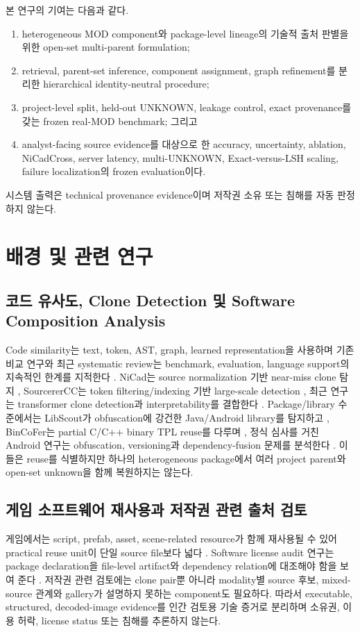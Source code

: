 \documentclass[runningheads]{llncs}
\begin{document}
본 연구의 기여는 다음과 같다.
\begin{enumerate}
    \item heterogeneous MOD component와 package-level lineage의 기술적 출처 판별을 위한 open-set multi-parent formulation;
    \item retrieval, parent-set inference, component assignment, graph refinement를 분리한 hierarchical identity-neutral procedure;
    \item project-level split, held-out UNKNOWN, leakage control, exact provenance를 갖는 frozen real-MOD benchmark; 그리고
    \item analyst-facing source evidence를 대상으로 한 accuracy, uncertainty, ablation, NiCadCross, server latency, multi-UNKNOWN, Exact-versus-LSH scaling, failure localization의 frozen evaluation이다.
\end{enumerate}
시스템 출력은 technical provenance evidence이며 저작권 소유 또는 침해를 자동 판정하지 않는다.

\section{배경 및 관련 연구}

\subsection{코드 유사도, Clone Detection 및 Software Composition Analysis}
Code similarity는 text, token, AST, graph, learned representation을 사용하며 기존 비교 연구와 최근 systematic review는 benchmark, evaluation, language support의 지속적인 한계를 지적한다 \cite{roy2009comparison,zakeri2023slr}. NiCad는 source normalization 기반 near-miss clone 탐지 \cite{roy2008nicad}, SourcererCC는 token filtering/indexing 기반 large-scale detection \cite{sajnani2016sourcerer}, 최근 연구는 transformer clone detection과 interpretability를 결합한다 \cite{clonexformer2025}. Package/library 수준에서는 LibScout가 obfuscation에 강건한 Java/Android library를 탐지하고 \cite{backes2016libscout}, BinCoFer는 partial C/C++ binary TPL reuse를 다루며 \cite{bincofer2025}, 정식 심사를 거친 Android 연구는 obfuscation, versioning과 dependency-fusion 문제를 분석한다 \cite{androidtpl2025,libmd2025}. 이들은 reuse를 식별하지만 하나의 heterogeneous package에서 여러 project parent와 open-set unknown을 함께 복원하지는 않는다.

\subsection{게임 소프트웨어 재사용과 저작권 관련 출처 검토}
게임에서는 script, prefab, asset, scene-related resource가 함께 재사용될 수 있어 practical reuse unit이 단일 source file보다 넓다 \cite{trasobares2025reuse}. Software license audit 연구는 package declaration을 file-level artifact와 dependency relation에 대조해야 함을 보여 준다 \cite{german2010licensing}. 저작권 관련 검토에는 clone pair뿐 아니라 modality별 source 후보, mixed-source 관계와 gallery가 설명하지 못하는 component도 필요하다. 따라서 executable, structured, decoded-image evidence를 인간 검토용 기술 증거로 분리하며 소유권, 이용 허락, license status 또는 침해를 추론하지 않는다.
\end{document}
